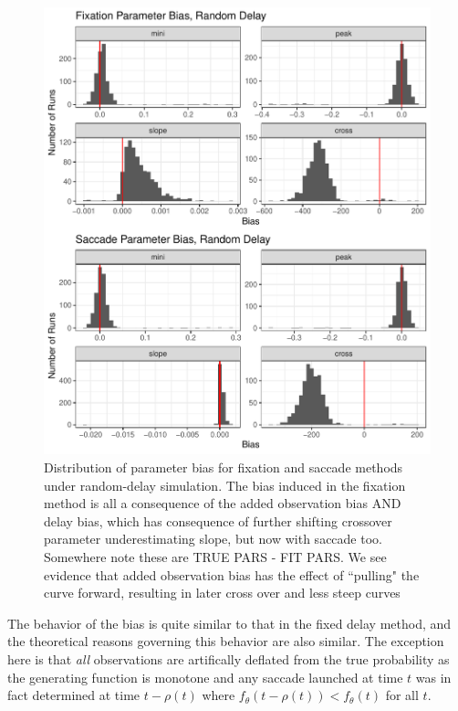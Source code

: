 \documentclass{article}
\begin{document}
\begin{figure}[H]
\centering
\includegraphics{random_delay_par_bias.pdf}
\caption{Distribution of parameter bias for fixation and saccade methods under random-delay simulation. The bias induced in the fixation method is all a consequence of the added observation bias AND delay bias, which has consequence of further shifting crossover parameter underestimating slope, but now with saccade too. Somewhere note these are TRUE PARS - FIT PARS. We see evidence that added observation bias has the effect of ``pulling" the curve forward, resulting in later cross over and less steep curves}
\label{fig:random_par_bias}
\end{figure}

The behavior of the bias is quite similar to that in the fixed delay method, and the theoretical reasons governing this behavior are also similar. The exception here is that \textit{all} observations are artifically deflated from the true probability as the generating function is monotone and any saccade launched at time $t$ was in fact determined at time $t - \rho(t)$ where $f_{\theta}(t - \rho(t)) < f_{\theta}(t)$ for all $t$.
\end{document}
